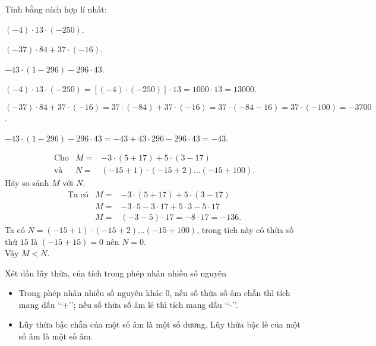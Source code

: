 \begin{vd}%
Tính bằng cách hợp lí nhất:
\begin{enumEX}{2}
	\item $ (-4) \cdot 13 \cdot (-250) $.
	\item $ (-37) \cdot 84+37 \cdot (-16) $.
	\item $ -43 \cdot (1-296)-296 \cdot 43 $.
\end{enumEX}	
\loigiai
{
\begin{enumEX}{1}
	\item $ (-4) \cdot 13 \cdot (-250) =[(-4) \cdot (-250)]\cdot 13=1000 \cdot 13=13000$.
	\item $ (-37) \cdot 84+37 \cdot (-16) =37 \cdot (-84)+37 \cdot (-16)=37 \cdot (-84-16)=37 \cdot (-100)=-3700$.
	\item $ -43 \cdot (1-296)-296 \cdot 43 =-43+43 \cdot 296 -296 \cdot 43=-43$.
\end{enumEX}	
}
\end{vd}

\begin{vd}%
\begin{eqnarray*}
\text{Cho} &M=&-3 \cdot (5+17)+5\cdot (3-17)\\
\text{và}&N=&(-15+1) \cdot (-15+2) \ldots (-15+100).
\end{eqnarray*}
Hãy so sánh $ M $ với $ N $.	
\loigiai
{
\begin{eqnarray*}
\text{Ta có} &M=&-3 \cdot (5+17)+5\cdot (3-17)\\
&M=&-3 \cdot 5 -3 \cdot 17+5 \cdot 3-5 \cdot 17\\
&M=&(-3-5) \cdot 17=-8 \cdot 17=-136.
\end{eqnarray*}	
Ta có $ N=(-15+1) \cdot (-15+2) \ldots (-15+100)$, trong tích này có thừa số thứ $ 15 $ là $ (-15+15)=0 $ nên $ N=0 $.\\
Vậy $ M<N $.
}
\end{vd}





\begin{dang}{Xét dấu lũy thừa, của tích trong phép nhân nhiều số nguyên}
\begin{itemize}
	\item Trong phép nhân nhiều số nguyên khác $ 0 $, nếu số thừa số âm chẵn thì tích mang dấu \lq\lq+\rq\rq \;; nếu số thừa số âm lẻ thì tích mang dấu \lq\lq-\rq\rq.
	\item Lũy thừa bậc chẵn của một số âm là một số dương. Lũy thừa bậc lẻ của một số âm là một số âm.
\end{itemize}
\end{dang}



